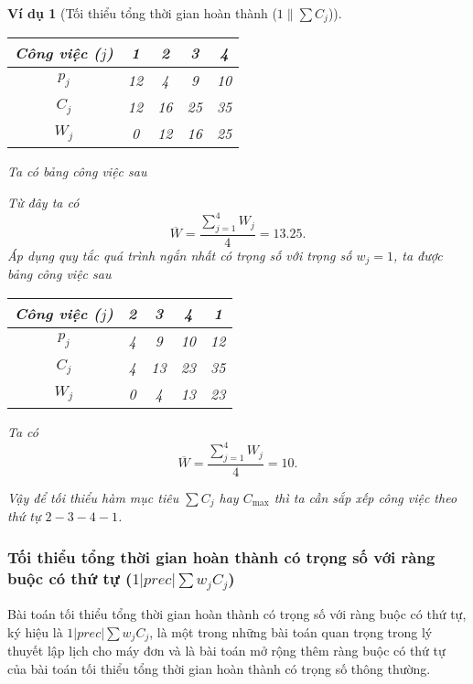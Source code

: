 \documentclass[12pt,a4paper]{report}
\newtheorem{vd}{Ví dụ}
\begin{document}
\begin{vd}[Tối thiểu tổng thời gian hoàn thành ($1 \| \sum C_j$)]
\begin{table}[h!]
	\centering
	\begin{tabular}{|c | c c c c |} 
	\hline
	Công việc ($j$) & 1 & 2 & 3 & 4 \\
	\hline\hline
	$p_j$ & 12 & 4 & 9 & 10 \\
	$C_j$ & 12 & 16 & 25 & 35 \\
	$W_j$ & 0 & 12 & 16 & 25 \\
	\hline
	\end{tabular}
\end{table}
Ta có bảng công việc sau

Từ đây ta có
\begin{equation*}
\overline{W}=\frac{\sum_{j=1}^{4}W_j}{4} = 13.25.
\end{equation*}
Áp dụng quy tắc quá trình ngắn nhất có trọng số với trọng số $w_j=1$, ta được bảng công việc sau
\begin{table}[h!]
	\centering
	\begin{tabular}{|c | c c c c |} 
	\hline
	Công việc ($j$) & 2 & 3 & 4 & 1 \\
	\hline\hline
	$p_j$ & 4 & 9 & 10 & 12 \\
	$C_j$ & 4 & 13 & 23 & 35 \\
	$W_j$ & 0 & 4 & 13 & 23 \\
	\hline
	\end{tabular}
\end{table}

Ta có
\begin{equation*}
\overline{W}=\frac{\sum_{j=1}^{4}W_j}{4} = 10.
\end{equation*}

Vậy để tối thiểu hàm mục tiêu $\sum C_j$ hay $C_{\max}$ thì ta cần sắp xếp công việc theo thứ tự $2-3-4-1$.
\end{vd}

\subsubsection*{Tối thiểu tổng thời gian hoàn thành có trọng số với ràng buộc có thứ tự ($1 | prec | \sum w_j C_j$)}
Bài toán tối thiểu tổng thời gian hoàn thành có trọng số với ràng buộc có thứ tự, ký hiệu là $1|prec|\sum w_j C_j$, là một trong những bài toán quan trọng trong lý thuyết lập lịch cho máy đơn và là bài toán mở rộng thêm ràng buộc có thứ tự của bài toán tối thiểu tổng thời gian hoàn thành có trọng số thông thường.
\end{document}
